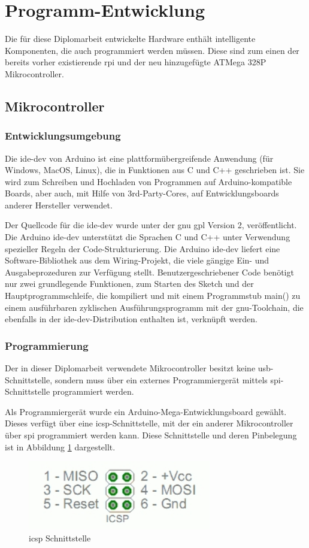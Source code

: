 \wip
\section{Programm-Entwicklung}
Die für diese Diplomarbeit entwickelte Hardware enthält intelligente Komponenten, die auch programmiert werden müssen.
Diese sind zum einen der bereits vorher existierende \ac{rpi} und der neu hinzugefügte ATMega 328P Mikrocontroller.
\subsection{Mikrocontroller}
\subsubsection{Entwicklungsumgebung}
Die \ac{ide-dev} von Arduino ist eine plattformübergreifende Anwendung (für Windows, MacOS, Linux), die in Funktionen aus C und C++ geschrieben ist.
Sie wird zum Schreiben und Hochladen von Programmen auf Arduino-kompatible Boards, aber auch, mit Hilfe von 3rd-Party-Cores, auf Entwicklungsboards anderer Hersteller verwendet.

Der Quellcode für die \ac{ide-dev} wurde unter der \ac{gnu} \ac{gpl} Version 2, veröffentlicht.
Die Arduino \ac{ide-dev} unterstützt die Sprachen C und C++ unter Verwendung spezieller Regeln der Code-Strukturierung.
Die Arduino \ac{ide-dev} liefert eine Software-Bibliothek aus dem Wiring-Projekt, die viele gängige Ein- und Ausgabeprozeduren zur Verfügung stellt.
Benutzergeschriebener Code benötigt nur zwei grundlegende Funktionen, zum Starten des Sketch und der Hauptprogrammschleife, die kompiliert und mit einem Programmstub main() zu einem ausführbaren zyklischen Ausführungsprogramm mit der \ac{gnu}-Toolchain, die ebenfalls in der \ac{ide-dev}-Distribution enthalten ist, verknüpft werden.

\subsubsection{Programmierung}
Der in dieser Diplomarbeit verwendete Mikrocontroller besitzt keine \ac{usb}-Schnittstelle, sondern muss über ein externes Programmiergerät mittels \ac{spi}-Schnittstelle programmiert werden.

Als Programmiergerät wurde ein Arduino-Mega-Entwicklungsboard gewählt. Dieses verfügt über eine \ac{icsp}-Schnittstelle, mit der ein anderer Mikrocontroller über \ac{spi} programmiert werden kann. Diese Schnittstelle und deren Pinbelegung ist in Abbildung \ref{fig:icsp-header} dargestellt.
\begin{figure}[htbp!]
    \centering
    \includegraphics[width=8cm]{images/hardware-programmierung/ICSPHeader.jpg}
    \caption{\ac{icsp} Schnittstelle}
    \label{fig:icsp-header}
\end{figure}

